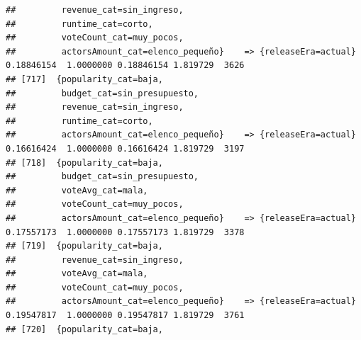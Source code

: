 \documentclass[
]{article}
\begin{document}
\begin{verbatim}
##         revenue_cat=sin_ingreso,                                                                                                
##         runtime_cat=corto,                                                                                                      
##         voteCount_cat=muy_pocos,                                                                                                
##         actorsAmount_cat=elenco_pequeño}    => {releaseEra=actual}               0.18846154  1.0000000 0.18846154 1.819729  3626
## [717]  {popularity_cat=baja,                                                                                                    
##         budget_cat=sin_presupuesto,                                                                                             
##         revenue_cat=sin_ingreso,                                                                                                
##         runtime_cat=corto,                                                                                                      
##         actorsAmount_cat=elenco_pequeño}    => {releaseEra=actual}               0.16616424  1.0000000 0.16616424 1.819729  3197
## [718]  {popularity_cat=baja,                                                                                                    
##         budget_cat=sin_presupuesto,                                                                                             
##         voteAvg_cat=mala,                                                                                                       
##         voteCount_cat=muy_pocos,                                                                                                
##         actorsAmount_cat=elenco_pequeño}    => {releaseEra=actual}               0.17557173  1.0000000 0.17557173 1.819729  3378
## [719]  {popularity_cat=baja,                                                                                                    
##         revenue_cat=sin_ingreso,                                                                                                
##         voteAvg_cat=mala,                                                                                                       
##         voteCount_cat=muy_pocos,                                                                                                
##         actorsAmount_cat=elenco_pequeño}    => {releaseEra=actual}               0.19547817  1.0000000 0.19547817 1.819729  3761
## [720]  {popularity_cat=baja,                                                                                                    

\end{verbatim}
\end{document}
